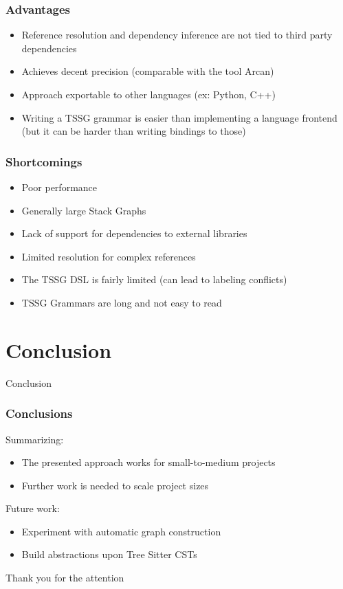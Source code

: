 \documentclass[table]{beamer}
\begin{document}
\begin{frame}
  \frametitle{Advantages}
  \centering
  \begin{itemize}
    \item Reference resolution and dependency inference are not tied to third party dependencies
    \item Achieves decent precision (comparable with the tool Arcan)
    \item Approach exportable to other languages (ex: Python, C++)
    \item Writing a TSSG grammar is easier than implementing a language frontend \\
    (but it can be harder than writing bindings to those)
  \end{itemize}
\end{frame}

\begin{frame}
  \frametitle{Shortcomings}
  \centering
  \begin{itemize}
    \item Poor performance
    \item Generally large Stack Graphs
    \item Lack of support for dependencies to external libraries
    \item Limited resolution for complex references
    \item The TSSG DSL is fairly limited (can lead to labeling conflicts)
    \item TSSG Grammars are long and not easy to read
  \end{itemize}
\end{frame}

\section{Conclusion}
\begin{frame}
  \centering
  \huge Conclusion
\end{frame}

\begin{frame}
  \frametitle{Conclusions}
  Summarizing:
  \begin{itemize}
    \item The presented approach works for small-to-medium projects
    \item Further work is needed to scale project sizes
  \end{itemize}

  \vspace{0.9cm}

  Future work:
  \begin{itemize}
    \item Experiment with automatic graph construction
    \item Build abstractions upon Tree Sitter CSTs
  \end{itemize}
\end{frame}

\begin{frame}
  \centering
  \huge Thank you for the attention
\end{frame}
\end{document}
